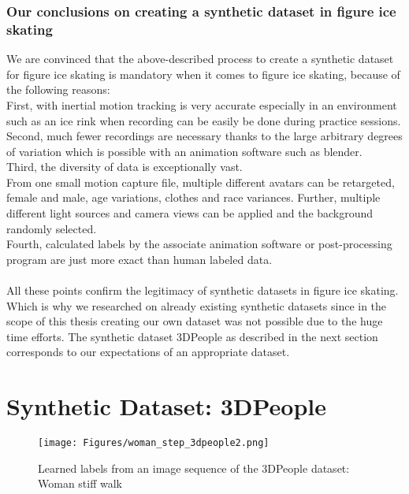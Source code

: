 \subsubsection*{Our conclusions on creating a synthetic dataset in figure ice skating}
We are convinced that the above-described process to create a synthetic dataset for figure ice skating is mandatory
when it comes to figure ice skating,
because of the following reasons:\\
First, with inertial motion tracking is very accurate especially in an environment such as an ice rink when recording
can be easily be done during practice sessions.\\
Second, much fewer recordings are necessary thanks to the large arbitrary degrees of variation which is possible with
an animation software such as blender.\\
Third, the diversity of data is exceptionally vast.\\
From one small motion capture file, multiple different avatars can be retargeted, female and male, age variations,
clothes and race variances.
Further, multiple different light sources and camera views can be applied and the background randomly selected.\\
Fourth, calculated labels by the associate animation software or post-processing program are just more exact than
human labeled data.
\\\mbox{}\\
All these points confirm the legitimacy of synthetic datasets in figure ice skating.
Which is why we researched on already existing synthetic datasets since in the scope of this thesis creating our own
dataset was not possible due to the huge time efforts.
The synthetic dataset 3DPeople as described in the next section corresponds to our expectations of an appropriate dataset.




\section{Synthetic Dataset: 3DPeople}

\begin{figure}
    \centering
    \texttt{[image: Figures/woman\_step\_3dpeople2.png]}
    \decoRule
    \caption[3DPeople: Woman stiff walk (labeled)]{Learned labels from an image sequence of the 3DPeople dataset: Woman stiff walk}
    \label{fig:woman_step_3dpeople}
\end{figure}


